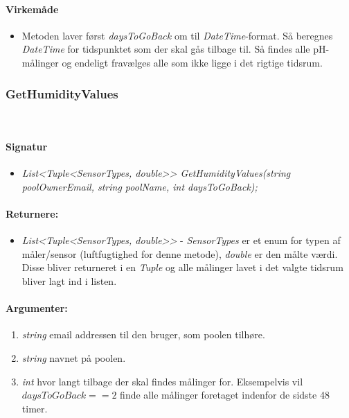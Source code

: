\paragraph{Virkemåde}
\begin{itemize}
	\item Metoden laver først \textit{daysToGoBack} om til \textit{DateTime}-format. Så beregnes \textit{DateTime} for tidspunktet som der skal gås tilbage til. Så findes alle pH-målinger og endeligt fravælges alle som ikke ligge i det rigtige tidsrum.
\end{itemize}









\subsubsection{GetHumidityValues}\ %







\paragraph{Signatur}
\begin{itemize}
	\item \textit{List<Tuple<SensorTypes, double>> GetHumidityValues(string poolOwnerEmail, string poolName, int daysToGoBack);}
\end{itemize}

\paragraph{Returnere:}
\begin{itemize}
	\item \textit{List<Tuple<SensorTypes, double>>} - \textit{SensorTypes} er et enum for typen af måler/sensor (luftfugtighed for denne metode), \textit{double} er den målte værdi. Disse bliver returneret i en \textit{Tuple} og alle målinger lavet i det valgte tidsrum bliver lagt ind i listen.
\end{itemize}

\paragraph{Argumenter:}
\begin{enumerate}
	\item \textit{string} email addressen til den bruger, som poolen tilhøre.
	\item \textit{string} navnet på poolen.
	\item \textit{int} hvor langt tilbage der skal findes målinger for. Eksempelvis vil $daysToGoBack == 2$ finde alle målinger foretaget indenfor de sidste 48 timer.
\end{enumerate}

